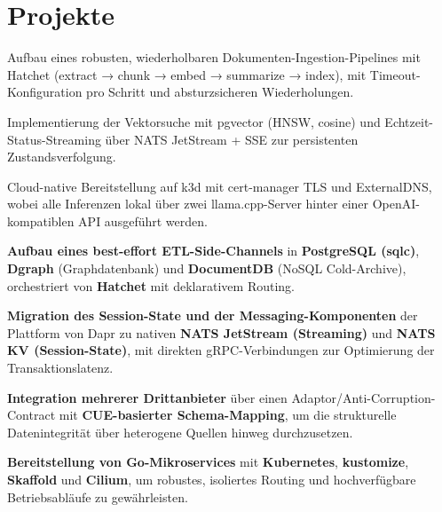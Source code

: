 \documentclass[10pt,a4paper]{resume}
\begin{document}
\vspace{2pt}

\section{Projekte}

\bullets
  \item Aufbau eines robusten, wiederholbaren Dokumenten-Ingestion-Pipelines mit Hatchet (extract → chunk → embed → summarize → index), mit Timeout-Konfiguration pro Schritt und absturzsicheren Wiederholungen.
  \item Implementierung der Vektorsuche mit pgvector (HNSW, cosine) und Echtzeit-Status-Streaming über NATS JetStream + SSE zur persistenten Zustandsverfolgung.
  \item Cloud-native Bereitstellung auf k3d mit cert-manager TLS und ExternalDNS, wobei alle Inferenzen lokal über zwei llama.cpp-Server hinter einer OpenAI-kompatiblen API ausgeführt werden.
\bulletsend
\vspace{1.0pt}
\bullets
  \item \textbf{Aufbau eines best-effort ETL-Side-Channels} in \textbf{PostgreSQL (sqlc)}, \textbf{Dgraph} (Graphdatenbank) und \textbf{DocumentDB} (NoSQL Cold-Archive), orchestriert von \textbf{Hatchet} mit deklarativem Routing.
  \item \textbf{Migration des Session-State und der Messaging-Komponenten} der Plattform von Dapr zu nativen \textbf{NATS JetStream (Streaming)} und \textbf{NATS KV (Session-State)}, mit direkten gRPC-Verbindungen zur Optimierung der Transaktionslatenz.
  \item \textbf{Integration mehrerer Drittanbieter} über einen Adaptor/Anti-Corruption-Contract mit \textbf{CUE-basierter Schema-Mapping}, um die strukturelle Datenintegrität über heterogene Quellen hinweg durchzusetzen.
  \item \textbf{Bereitstellung von Go-Mikroservices} mit \textbf{Kubernetes}, \textbf{kustomize}, \textbf{Skaffold} und \textbf{Cilium}, um robustes, isoliertes Routing und hochverfügbare Betriebsabläufe zu gewährleisten.
\bulletsend
\end{document}
